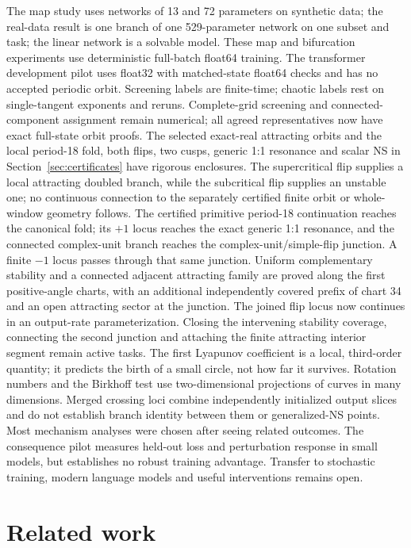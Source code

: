 \documentclass[11pt,letterpaper]{article}
\begin{document}
The map study uses networks of 13 and 72 parameters on synthetic data; the real-data result is one branch of one
529-parameter network on one subset and task; the linear network is a solvable model. These map and bifurcation
experiments use deterministic full-batch float64 training. The transformer development pilot uses float32
with matched-state float64 checks and has no accepted periodic orbit. Screening labels are finite-time; chaotic labels rest on single-tangent exponents and
reruns. Complete-grid screening and connected-component assignment remain numerical; all \nCensusAll{} agreed representatives now have exact full-state orbit proofs. The \nCertifiedOrbits{} selected exact-real attracting orbits and
the local period-18 fold, both flips, two cusps, generic 1:1 resonance and scalar NS in Section~\ref{sec:certificates} have rigorous enclosures. The supercritical flip supplies a local attracting doubled branch, while the subcritical flip supplies an unstable one; no continuous connection to the separately certified finite orbit or whole-window geometry follows. The certified primitive period-18 continuation reaches the canonical fold; its $+1$ locus reaches the exact generic 1:1 resonance, and the connected complex-unit branch reaches the complex-unit/simple-flip junction. A finite $-1$ locus passes through that same junction. Uniform complementary stability and a connected adjacent attracting family are proved along the first \nPALStableCharts{} positive-angle charts, with an additional independently covered prefix of chart 34 and an open attracting sector at the junction. The joined flip locus now continues in an output-rate parameterization. Closing the intervening stability coverage, connecting the second junction and attaching the finite attracting interior segment remain active tasks. The first Lyapunov coefficient is a local, third-order
quantity; it predicts the birth of a small circle, not how far it survives. Rotation numbers and the Birkhoff test
use two-dimensional projections of curves in many dimensions. Merged crossing loci combine independently
initialized output slices and do not establish branch identity between them or generalized-NS points.
Most mechanism analyses were chosen after seeing
related outcomes. The consequence pilot measures held-out loss and perturbation response in small models, but establishes no
robust training advantage. Transfer to stochastic training, modern language models and useful interventions
remains open.

\section{Related work}
\label{sec:related}
\end{document}
